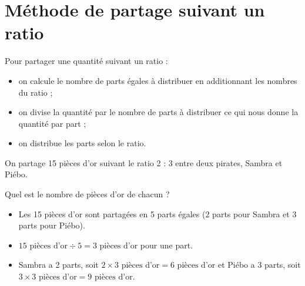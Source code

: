 \section{Méthode de partage suivant un ratio}

\begin{methode}
Pour partager une quantité suivant un ratio :
   \begin{itemize}
      \item on calcule le nombre de parts égales à distribuer en additionnant les nombres du ratio ;
      \item on divise la quantité par le nombre de parts à distribuer ce qui nous donne la quantité par part ;
      \item on distribue les parts selon le ratio.
   \end{itemize}
   \exercice
   On partage 15 pièces d'or suivant le ratio 2 : 3 entre deux pirates, Sambra et Piébo. 
   
   \bigskip
   Quel est le nombre de pièces d'or de chacun ?
   \correction
   \ \\ [-10mm]
   \begin{itemize}
      \item Les 15 pièces d'or sont partagées en 5 parts égales (2 parts pour Sambra et 3 parts pour Piébo).
      \item $15\text{ pièces d'or}\div 5 =3\text{ pièces d'or}$ pour une part.
     \item Sambra a 2 parts, soit $2\times3\text{ pièces d'or} =6\text{ pièces d'or}$ et Piébo a 3 parts, soit $3\times3\text{ pièces d'or} =9\text{ pièces d'or}$. 
   \end{itemize}
   \vspace*{-7mm}
    \begin{center}
    \end{center}
\end{methode}